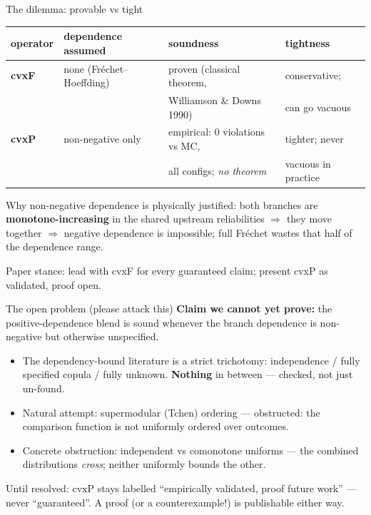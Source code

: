 \documentclass[aspectratio=169,11pt]{beamer}
\newcommand{\good}[1]{\textcolor{ipablue}{#1}}
\newcommand{\bad}[1]{\textcolor{ipared}{#1}}
\begin{document}
\begin{frame}{The dilemma: provable vs tight}
\begin{center}\small
\begin{tabular}{llll}
\toprule
operator & dependence assumed & soundness & tightness\\
\midrule
\textbf{cvxF} & none (Fr\'echet--Hoeffding) & \good{proven} (classical theorem, & conservative;\\
 & & Williamson \& Downs 1990) & can go vacuous\\[1mm]
\textbf{cvxP} & non-negative only & \bad{empirical}: 0 violations vs MC, & tighter; never\\
 & & all configs; \emph{no theorem} & vacuous in practice\\
\bottomrule
\end{tabular}
\end{center}
\medskip
Why non-negative dependence is physically justified: both branches are \textbf{monotone-increasing} in
the shared upstream reliabilities $\Rightarrow$ they move together $\Rightarrow$ negative dependence is
impossible; full Fr\'echet wastes that half of the dependence range.
\medskip

Paper stance: \good{lead with cvxF for every guaranteed claim}; present cvxP as validated, proof open.
\end{frame}

\begin{frame}{The open problem (please attack this)}
\textbf{Claim we cannot yet prove:} the positive-dependence blend is sound whenever the branch
dependence is non-negative but otherwise unspecified.
\begin{itemize}
\item The dependency-bound literature is a strict trichotomy: independence / fully specified copula /
  fully unknown. \textbf{Nothing} in between --- checked, not just un-found.
\item Natural attempt: supermodular (Tchen) ordering --- \bad{obstructed}: the comparison function is
  not uniformly ordered over outcomes.
\item Concrete obstruction: independent vs comonotone uniforms --- the combined distributions
  \emph{cross}; neither uniformly bounds the other.
\end{itemize}
\medskip
Until resolved: cvxP stays labelled ``empirically validated, proof future work'' --- never
``guaranteed''. A proof (or a counterexample!) is publishable either way.
\end{frame}
\end{document}
